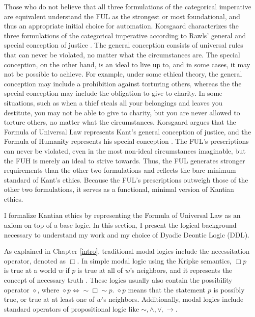 \begin{isabellebody}
\begin{isamarkuptext}
Those who do not believe that all three formulations of the categorical imperative are equivalent
understand the FUL as the strongest or most foundational, and thus an appropriate initial choice for 
automation. Korsgaard characterizes the three formulations of the categorical
imperative according to Rawls' general and special conception of justice \cite{theoryofjustice}. The general conception 
consists of universal rules that can never be violated, no matter what the circumstances are. The special
conception, on the other hand, is an ideal to live up to, and in some cases, it may not be possible to 
achieve. For example, under some ethical theory, the general conception may include a prohibition against 
torturing others, whereas the the special conception may include the obligation to give to charity. 
In some situations, such as when a thief steals all your belongings and leaves you destitute, you may not 
be able to give to charity, but you are never allowed to torture others, no matter what the circumstances.
Korsgaard argues that the Formula of Universal Law represents Kant's general conception of justice, and the Formula of 
Humanity represents his special conception \citep[19]{KorsgaardRTL}. The FUL's prescriptions can never 
be violated, even in the most non-ideal circumstances imaginable, but the FUH is merely an ideal to 
strive towards. Thus, the FUL generates stronger requirements than the other two formulations and reflects 
the bare minimum standard of Kant's ethics. Because the FUL's prescriptions outweigh those of the other 
two formulations, it serves as a functional, minimal version of Kantian ethics.%
\end{isamarkuptext}\isamarkuptrue%
%
\isadelimdocument
%
\endisadelimdocument
%
\isatagdocument
%
\isamarkuptrue%
%
\endisatagdocument
{\isafolddocument}%
%
\isadelimdocument
%
\endisadelimdocument
%
\begin{isamarkuptext}%
I formalize Kantian ethics by representing the Formula of Universal Law as an axiom on top of a base
logic. In this section, I present the logical background necessary to understand my work and my 
choice of Dyadic Deontic Logic (DDL).

As explained in Chapter \ref{intro}, traditional modal logics include the necessitation operator, denoted as $\Box$. In simple modal logic
using the Kripke semantics, $\Box p$ is true at a world $w$ if $p$ is true at all of $w$'s neighbors, 
and it represents the concept of necessary truth \citep{cresswell}. 
These logics usually also contain the possibility operator $\diamond$, where $\diamond p \iff \sim \Box \sim p$. 
$\diamond p$ means that the statement $p$ is possibly true, or true at at least one of $w$'s neighbors. 
Additionally, modal logics include standard operators of propositional logic like $\sim, \wedge, \vee, \rightarrow$.


\end{isamarkuptext}
\end{isabellebody}

